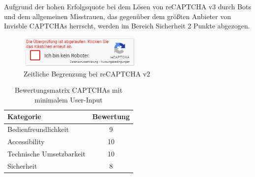 Aufgrund der hohen Erfolgsquote bei dem Lösen von reCAPTCHA v3 durch Bots 
und dem allgemeinen Misstrauen, das gegenüber dem größten Anbieter von Invisble CAPTCHAs herrscht, 
werden im Bereich Sicherheit 2 Punkte abgezogen.

\begin{figure}[h!]
    \centering\includegraphics[width=6cm]{gfx/mygraphics/recaptchaabgelaufen.png}
     \caption{Zeitliche Begrenzung bei reCAPTCHA v2}
      \label{fig:recaptchaabgelaufen}
\end{figure}

\begin{table}[h!]
    \caption{Bewertungsmatrix CAPTCHAs mit minimalem User-Input}
    \begin{center}
        \begin{tabular}{l|c}
            Kategorie                       & Bewertung \\\hline
            Bedienfreundlichkeit            & 9         \\
            Accessibility                   & 10        \\
            Technische Umsetzbarkeit        & 10         \\
            Sicherheit                      & 8         
        \end{tabular}
    \end{center}
\end{table}